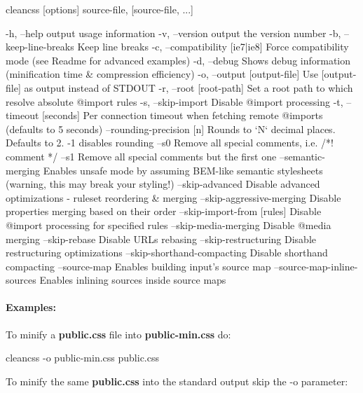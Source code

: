 \begin{DoxyCode}
cleancss [options] source-file, [source-file, ...]

-h, --help                     output usage information
-v, --version                  output the version number
-b, --keep-line-breaks         Keep line breaks
-c, --compatibility [ie7|ie8]  Force compatibility mode (see Readme for advanced examples)
-d, --debug                    Shows debug information (minification time & compression efficiency)
-o, --output [output-file]     Use [output-file] as output instead of STDOUT
-r, --root [root-path]         Set a root path to which resolve absolute @import rules
-s, --skip-import              Disable @import processing
-t, --timeout [seconds]        Per connection timeout when fetching remote @imports (defaults to 5 seconds)
--rounding-precision [n]       Rounds to `N` decimal places. Defaults to 2. -1 disables rounding
--s0                           Remove all special comments, i.e. /*! comment */
--s1                           Remove all special comments but the first one
--semantic-merging             Enables unsafe mode by assuming BEM-like semantic stylesheets (warning, this
       may break your styling!)
--skip-advanced                Disable advanced optimizations - ruleset reordering & merging
--skip-aggressive-merging      Disable properties merging based on their order
--skip-import-from [rules]     Disable @import processing for specified rules
--skip-media-merging           Disable @media merging
--skip-rebase                  Disable URLs rebasing
--skip-restructuring           Disable restructuring optimizations
--skip-shorthand-compacting    Disable shorthand compacting
--source-map                   Enables building input's source map
--source-map-inline-sources    Enables inlining sources inside source maps
\end{DoxyCode}


\paragraph*{Examples\+:}

To minify a {\bfseries public.\+css} file into {\bfseries public-\/min.\+css} do\+:


\begin{DoxyCode}
cleancss -o public-min.css public.css
\end{DoxyCode}


To minify the same {\bfseries public.\+css} into the standard output skip the {\ttfamily -\/o} parameter\+:


